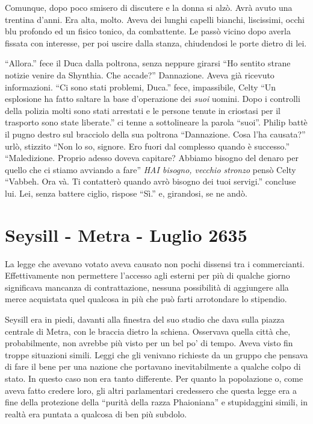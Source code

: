     Comunque, dopo poco smisero di discutere e la donna si alzò. Avrà avuto
    una trentina d'anni. Era alta, molto. Aveva dei lunghi capelli bianchi,
    liscissimi, occhi blu profondo ed un fisico tonico, da combattente. Le
    passò vicino dopo averla fissata con interesse, per poi uscire dalla
    stanza, chiudendosi le porte dietro di lei. 

    ``Allora.'' fece il Duca dalla poltrona, senza neppure girarsi ``Ho
    sentito strane notizie venire da Shynthia. Che accade?'' Dannazione.
    Aveva già ricevuto informazioni. ``Ci sono stati problemi, Duca.''
    fece, impassibile, Celty ``Un esplosione ha fatto saltare la base
    d'operazione dei \emph{suoi} uomini. Dopo i controlli della polizia
    molti sono stati arrestati e le persone tenute in criostasi per il
    trasporto sono state liberate.'' ci tenne a sottolineare la parola
    ``suoi''. Philip battè il pugno destro sul bracciolo della sua poltrona
    ``Dannazione. Cosa l'ha causata?'' urlò, stizzito ``Non lo so, signore.
    Ero fuori dal complesso quando è successo.'' ``Maledizione. Proprio
    adesso doveva capitare? Abbiamo bisogno del denaro per quello che ci
    stiamo avviando a fare'' \emph{HAI bisogno, vecchio stronzo} pensò
    Celty ``Vabbeh. Ora và. Ti contatterò quando avrò bisogno dei tuoi
    servigi.'' concluse lui. Lei, senza battere ciglio, rispose ``Sì.'' e,
    girandosi, se ne andò.

  \section{Seysill - Metra - Luglio 2635}
    
    La legge che avevano votato aveva causato non pochi dissensi tra i
    commercianti. Effettivamente non permettere l'accesso agli esterni per
    più di qualche giorno significava mancanza di contrattazione, nessuna
    possibilità di aggiungere alla merce acquistata quel qualcosa in più
    che può farti arrotondare lo stipendio.

    Seysill era in piedi, davanti alla finestra del suo studio che dava sulla piazza
    centrale di Metra, con le braccia dietro la schiena. Osservava quella
    città che, probabilmente, non avrebbe più visto per un bel po' di
    tempo. Aveva visto fin troppe situazioni simili. Leggi che gli venivano
    richieste da un gruppo che pensava di fare il bene per una nazione che
    portavano inevitabilmente a qualche colpo di stato. In questo caso non
    era tanto differente. Per quanto la popolazione o, come aveva fatto
    credere loro, gli altri parlamentari credessero che questa legge era a
    fine della protezione della ``purità della razza Phaioniana'' e
    stupidaggini simili, in realtà era puntata a qualcosa di ben più
    subdolo.


